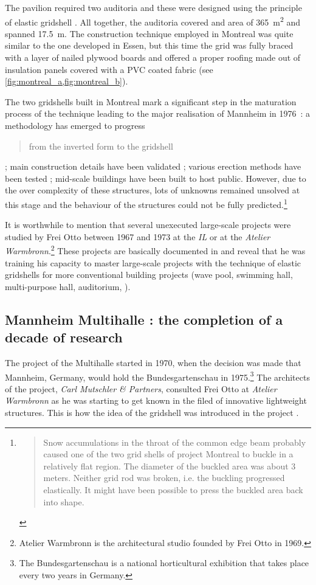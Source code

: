 The pavilion required two auditoria and these were designed using the principle of elastic gridshell \cite[p.~274]{IL10}. All together, the auditoria covered and area of \SI{365}{m^2} and spanned \SI{17.5}{m}. The construction technique employed in Montreal was quite similar to the one developed in Essen, but this time the grid was fully braced with a layer of nailed plywood boards and offered a proper roofing made out of insulation panels covered with a PVC coated fabric (see \cref{fig:montreal_a,fig:montreal_b}).

The two gridshells built in Montreal mark a significant step in the maturation process of the technique leading to the major realisation of Mannheim in 1976~: a methodology has emerged to progress \blockcquote[p.~179]{IL10}{from the inverted form to the gridshell} ; main construction details have been validated ; various erection methods have been tested ; mid-scale buildings have been built to host public. However, due to the over complexity of these structures, lots of unknowns remained unsolved at this stage and the behaviour of the structures could not be fully predicted.\footnote{\blockcquote[p.~219]{IL10}{Snow accumulations in the throat of the common edge beam probably caused one of the two grid shells of project Montreal to buckle in a relatively flat region. The diameter of the buckled area was about 3 meters. Neither grid rod was broken, i.e. the buckling progressed elastically. It might have been possible to press the buckled area back into shape.}}

It is worthwhile to mention that several unexecuted large-scale projects were studied by Frei Otto between 1967 and 1973 at the \emph{IL} or at the \emph{Atelier Warmbronn}.\footnote{Atelier Warmbronn is the architectural studio founded by Frei Otto in 1969.} These projects are basically documented in \cite[pp.~278 - 288]{IL10} and reveal that he was training his capacity to master large-scale projects with the technique of elastic gridshells for more conventional building projects (wave pool, swimming hall, multi-purpose hall, auditorium, \telp{}).

\subsection{Mannheim Multihalle : the completion of a decade of research}
The project of the Multihalle started in 1970, when the decision was made that Mannheim, Germany, would hold the Bundesgartenschau in 1975.\footnote{The Bundesgartenschau is a national horticultural exhibition that takes place every two years in Germany.} The architects of the project, \emph{Carl Mutschler \& Partners}, consulted Frei Otto at \emph{Atelier Warmbronn} as he was starting to get known in the filed of innovative lightweight structures. This is how the idea of the gridshell was introduced in the project \cite{Liddell2015}.

